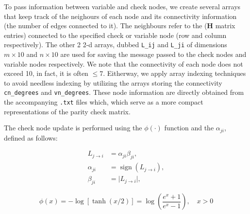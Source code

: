 \documentclass[12pt]{scrreprt}
\begin{document}
	To pass information between variable and check nodes, we create several arrays that keep track of the neighours of each node and its connectivity information (the number of edges connected to it). The neighbours refer to the ($\mathbf{H}$ matrix entries) connected to the specified check or variable node (row and column respectively). The other 2 2-d arrays, dubbed \verb*|L_ij| and \verb*|L_ji| of dimensions $m\times10$ and $n\times10$ are used for saving the message passed to the check nodes and variable nodes respectively. We note that the connectivity of each node does not exceed 10, in fact, it is often $\leq 7$. Eitherway, we apply array indexing techniques to avoid needless indexing by utilizing the arrays storing the connectivity \verb|cn_degrees| and \verb|vn_degrees|. These node information are directly obtained from the accompanying \verb|.txt| files which, which serve as a more compact representations of the parity check matrix. 
	
	The check node update is performed using the $\phi(\cdot)$ function and the $\alpha_{ji}$, defined as follows:
	
	\begin{align*}
		L_{j \rightarrow i} &= \alpha_{ji} \beta_{ji}, \\
		\alpha_{ji} &= \operatorname{sign}(L_{j \rightarrow i}), \\
		\beta_{ji} &= \lvert L_{j \rightarrow i} \rvert,
	\end{align*}
	
	
	\begin{equation}\label{eqn:phi_func}
	\phi(x) = -\log[\tanh(x/2)] = \log\left(\frac{e^x + 1}{e^x - 1}\right), \quad x > 0
	\end{equation}
	
\end{document}
